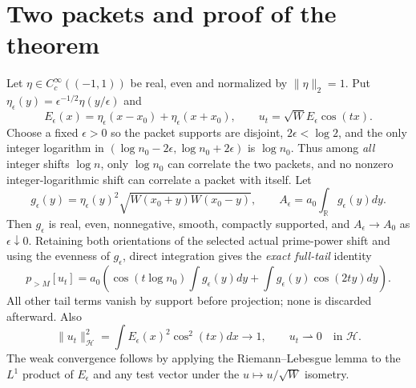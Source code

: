\documentclass[11pt]{article}
\newcommand{\R}{\mathbb R}\newcommand{\Hh}{\mathcal H}\newcommand{\Nn}{\mathcal N}\newcommand{\Kk}{\mathcal K}\newcommand{\norm}[1]{\lVert#1\rVert}\newcommand{\ip}[2]{\langle #1,#2\rangle}\newcommand{\dom}{\operatorname{Dom}}
\begin{document}
\section{Two packets and proof of the theorem}\label{packets}
Let $\eta\in C_c^\infty((-1,1))$ be real, even and normalized by $\norm\eta_2=1$. Put $\eta_\epsilon(y)=\epsilon^{-1/2}\eta(y/\epsilon)$ and
\[E_\epsilon(x)=\eta_\epsilon(x-x_0)+\eta_\epsilon(x+x_0),\qquad u_t=\sqrt W E_\epsilon\cos(tx).
\]
Choose a fixed $\epsilon>0$ so the packet supports are disjoint, $2\epsilon<\log2$, and the only integer logarithm in $(\log n_0-2\epsilon,\log n_0+2\epsilon)$ is $\log n_0$. Thus among \emph{all} integer shifts $\log n$, only $\log n_0$ can correlate the two packets, and no nonzero integer-logarithmic shift can correlate a packet with itself. Let
\[g_\epsilon(y)=\eta_\epsilon(y)^2\sqrt{W(x_0+y)W(x_0-y)},\qquad A_\epsilon=a_0\int_\R g_\epsilon(y)dy.\]
Then $g_\epsilon$ is real, even, nonnegative, smooth, compactly supported, and $A_\epsilon\to A_0$ as $\epsilon\downarrow0$. Retaining both orientations of the selected actual prime-power shift and using the evenness of $g_\epsilon$, direct integration gives the \emph{exact full-tail} identity
\begin{equation}\label{exactpacket}
 p_{>M}[u_t]=a_0\left(\cos(t\log n_0)\int g_\epsilon(y)dy+\int g_\epsilon(y)\cos(2ty)dy\right).
\end{equation}
All other tail terms vanish by support before projection; none is discarded afterward. Also
\begin{equation}\label{normweak}
 \norm{u_t}_{\Hh}^2=\int E_\epsilon(x)^2\cos^2(tx)dx\longrightarrow1,\qquad u_t\rightharpoonup0\quad\text{in }\Hh.
\end{equation}
The weak convergence follows by applying the Riemann--Lebesgue lemma to the $L^1$ product of $E_\epsilon$ and any test vector under the $u\mapsto u/\sqrt W$ isometry.
\end{document}
